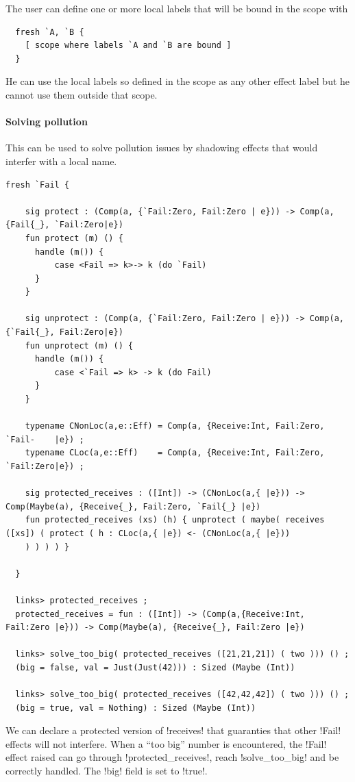 \documentclass[10pt, nonacm=true, language=french, language=english]{acmart}
\begin{document}
The user can define one or more local labels that will be bound in the scope with
\begin{lstlisting}
  fresh `A, `B {
    [ scope where labels `A and `B are bound ]
  }
\end{lstlisting}

He can use the local labels so defined in the scope as any other effect label but he cannot use them outside that scope.

\paragraph{Solving pollution}
This can be used to solve pollution issues by shadowing effects that would interfer with a local name.

\begin{lstlisting}[caption=Using local effects to avoid pollution]
  fresh `Fail {

    sig protect : (Comp(a, {`Fail:Zero, Fail:Zero | e})) -> Comp(a, {Fail{_}, `Fail:Zero|e})
    fun protect (m) () {
      handle (m()) {
          case <Fail => k>-> k (do `Fail)
      }
    }

    sig unprotect : (Comp(a, {`Fail:Zero, Fail:Zero | e})) -> Comp(a, {`Fail{_}, Fail:Zero|e})
    fun unprotect (m) () {
      handle (m()) {
          case <`Fail => k> -> k (do Fail)
      }
    }

    typename CNonLoc(a,e::Eff) = Comp(a, {Receive:Int, Fail:Zero, `Fail-    |e}) ;
    typename CLoc(a,e::Eff)    = Comp(a, {Receive:Int, Fail:Zero, `Fail:Zero|e}) ;

    sig protected_receives : ([Int]) -> (CNonLoc(a,{ |e})) -> Comp(Maybe(a), {Receive{_}, Fail:Zero, `Fail{_} |e})
    fun protected_receives (xs) (h) { unprotect ( maybe( receives ([xs]) ( protect ( h : CLoc(a,{ |e}) <- (CNonLoc(a,{ |e}))
    ) ) ) ) }

  }

  links> protected_receives ;
  protected_receives = fun : ([Int]) -> (Comp(a,{Receive:Int, Fail:Zero |e})) -> Comp(Maybe(a), {Receive{_}, Fail:Zero |e})

  links> solve_too_big( protected_receives ([21,21,21]) ( two ))) () ;
  (big = false, val = Just(Just(42))) : Sized (Maybe (Int))

  links> solve_too_big( protected_receives ([42,42,42]) ( two ))) () ;
  (big = true, val = Nothing) : Sized (Maybe (Int))
\end{lstlisting}

We can declare a protected version of !receives! that guaranties that other !Fail! effects will not interfere. When a ``too big'' number is encountered, the !Fail! effect raised can go through !protected_receives!, reach !solve_too_big!  and be correctly handled. The !big! field is set to !true!.
\end{document}
